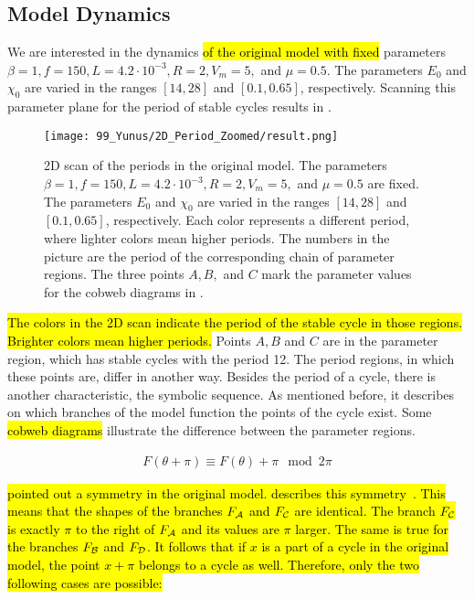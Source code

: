 \subsection{Model Dynamics}
\label{sec:state.og.dynamics}

We are interested in the dynamics \hl{of the original model with fixed} parameters $\beta = 1, f = 150, L = 4.2 \cdot 10^{-3}, R = 2, V_m = 5,$ and $\mu = 0.5$.
The parameters $E_0$ and $\chi_0$ are varied in the ranges $[14, 28]$ and $[0.1, 0.65]$, respectively.
Scanning this parameter plane for the period of stable cycles results in .

\begin{figure}
	\centering
	\texttt{[image: 99\_Yunus/2D\_Period\_Zoomed/result.png]}
	\caption[2D scan of the periods in the original model]{
		2D scan of the periods in the original model.
		The parameters $\beta = 1, f = 150, L = 4.2 \cdot 10^{-3}, R = 2, V_m = 5,$ and $\mu = 0.5$ are fixed.
		The parameters $E_0$ and $\chi_0$ are varied in the ranges $[14, 28]$ and $[0.1, 0.65]$, respectively.
		Each color represents a different period, where lighter colors mean higher periods.
		The numbers in the picture are the period of the corresponding chain of parameter regions.
		The three points $A, B,$ and $C$ mark the parameter values for the cobweb diagrams in .
	}
	\label{fig:setup.og.dynamics.period}
\end{figure}

\hl{
	The colors in the 2D scan  indicate the period of the stable cycle in those regions.
	Brighter colors mean higher periods.
}
Points $A, B$ and $C$ are in the parameter region, which has stable cycles with the period 12.
The period regions, in which these points are, differ in another way.
Besides the period of a cycle, there is another characteristic, the symbolic sequence.
As mentioned before, it describes on which branches of the model function the points of the cycle exist.
Some \hl{cobweb diagrams} illustrate the difference between the parameter regions.

\begin{align}
	F(\theta + \pi) \equiv F(\theta) + \pi \mod 2\pi \label{equ:state.og.sym}
\end{align}

\hl{
	 pointed out a symmetry in the original model.
	 describes this symmetry~\cite{akyuz2022}.
	This means that the shapes of the branches $F_{\mathcal{A}}$ and $F_{\mathcal{C}}$ are identical.
	The branch $F_{\mathcal{C}}$ is exactly $\pi$ to the right of $F_{\mathcal{A}}$ and its values are $\pi$ larger.
	The same is true for the branches $F_{\mathcal{B}}$ and $F_{\mathcal{D}}$.
	It follows that if $x$ is a part of a cycle in the original model, the point $x + \pi$ belongs to a cycle as well.
	Therefore, only the two following cases are possible:
}

